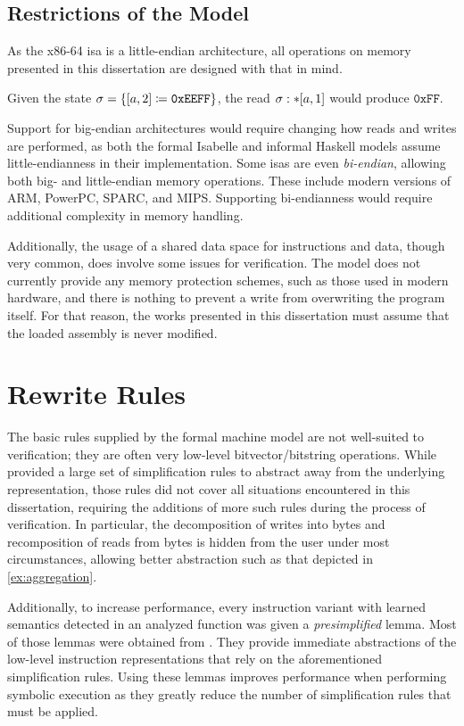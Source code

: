 \subsection{Restrictions of the Model}
As the x86-64 \ac{isa} is a little-endian architecture,%
all operations on memory presented in this dissertation
are designed with that in mind.
\begin{example}
  Given the state $\sigma=\{[a,2]\coloneqq\mathtt{0xEEFF}\}$,
  the read $\sigma:\ast[a,1]$ would produce $\mathtt{0xFF}$.
\end{example}
Support for big-endian architectures would require changing how reads and writes%
are performed, as both the formal Isabelle and informal Haskell models
assume little-endianness in their implementation.
Some \acp{isa} are even \emph{bi-endian}, allowing both big- and little-endian%
memory operations. These include modern versions of ARM, PowerPC, SPARC, and MIPS.
Supporting bi-endianness would require additional complexity in memory handling.

Additionally,
the usage of a shared data space for instructions and data, though very common,
does involve some issues for verification.
The model does not currently provide any memory protection schemes,%
such as those used in modern hardware,
and there is nothing to prevent a write from overwriting the program itself.
For that reason, the works presented in this dissertation
must assume that the loaded assembly is never modified.

\section{Rewrite Rules}\label{se:rewrite}
The basic rules supplied by the formal machine model are not well-suited to verification;
they are often very low-level bitvector/bitstring operations.
While \textcite{roessle2019} provided a large set of simplification rules
to abstract away from the underlying representation,
those rules did not cover all situations encountered in this dissertation,
requiring the additions of more such rules during the process of verification.
In particular, the decomposition of writes into bytes
and recomposition of reads from bytes is hidden from the user under most circumstances,
allowing better abstraction such as that depicted in \cref{ex:aggregation}.

Additionally, to increase performance,
every instruction variant with learned semantics detected in an analyzed function
was given a \emph{presimplified} lemma.%
Most of those lemmas were obtained from \autocite{verbeek2019refinement}.
They provide immediate abstractions of the low-level instruction representations
that rely on the aforementioned simplification rules.
Using these lemmas improves performance when performing symbolic execution
as they greatly reduce the number of simplification rules that must be applied.

